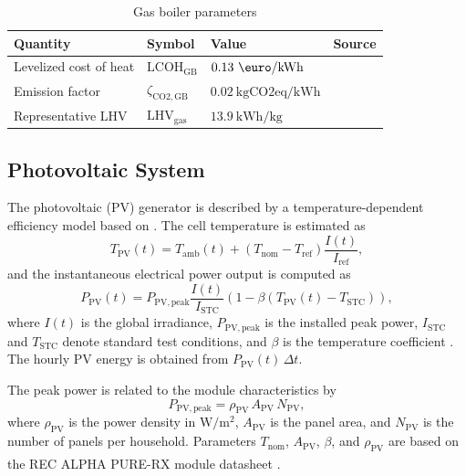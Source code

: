 \documentclass[12pt,a4paper]{report}
\begin{document}
\begin{table}[H]
\centering
\caption{Gas boiler parameters}
\label{tab:gas_boiler_parameters}
\begin{tabular}{llll}
\hline
Quantity & Symbol & Value & Source \\
\hline
Levelized cost of heat & \(\mathrm{LCOH}_{\mathrm{GB}}\) & \(0.13~\mathrm{\text{\euro}/kWh}\) & \cite{EC2020_LCOE} \\
Emission factor & \(\zeta_{\mathrm{CO2,GB}}\) & \(0.02~\mathrm{kgCO2eq/kWh}\) & \cite{winnipeg_biogas_2012} \\
Representative LHV & \(\mathrm{LHV}_{\mathrm{gas}}\) & \(13.9~\mathrm{kWh/kg}\) & \cite{f3centre_biogas_2024} \\
\hline
\end{tabular}
\end{table}

\subsection{Photovoltaic System}
\label{subsec:pv_system}

The photovoltaic (PV) generator is described by a temperature-dependent efficiency model based on \cite{HE2023113476}. The cell temperature is estimated as
\begin{equation}
T_{\mathrm{PV}}(t) = T_{\mathrm{amb}}(t) + \left(T_{\mathrm{nom}} - T_{\mathrm{ref}}\right) \frac{I(t)}{I_{\mathrm{ref}}},
\label{eq:pv_temperature}
\end{equation}
and the instantaneous electrical power output is computed as
\begin{equation}
P_{\mathrm{PV}}(t) = P_{\mathrm{PV,peak}}
\frac{I(t)}{I_{\mathrm{STC}}}
\left(1 - \beta\left(T_{\mathrm{PV}}(t) - T_{\mathrm{STC}}\right)\right),
\label{eq:pv_power}
\end{equation}
where \(I(t)\) is the global irradiance, \(P_{\mathrm{PV,peak}}\) is the installed peak power, \(I_{\mathrm{STC}}\) and \(T_{\mathrm{STC}}\) denote standard test conditions, and \(\beta\) is the temperature coefficient \cite{HE2023113476}. The hourly PV energy is obtained from \(P_{\mathrm{PV}}(t)\,\Delta t\).  

The peak power is related to the module characteristics by
\begin{equation}
P_{\mathrm{PV,peak}} = \rho_{\mathrm{PV}}\,A_{\mathrm{PV}}\,N_{\mathrm{PV}},
\label{eq:pv_peak_power}
\end{equation}
where \(\rho_{\mathrm{PV}}\) is the power density in \(\mathrm{W/m^2}\), \(A_{\mathrm{PV}}\) is the panel area, and \(N_{\mathrm{PV}}\) is the number of panels per household. Parameters \(T_{\mathrm{nom}}\), \(A_{\mathrm{PV}}\), \(\beta\), and \(\rho_{\mathrm{PV}}\) are based on the REC ALPHA\textsuperscript{\textregistered} PURE-RX module datasheet \cite{rec_alpha_pure_rx}.  
\end{document}
